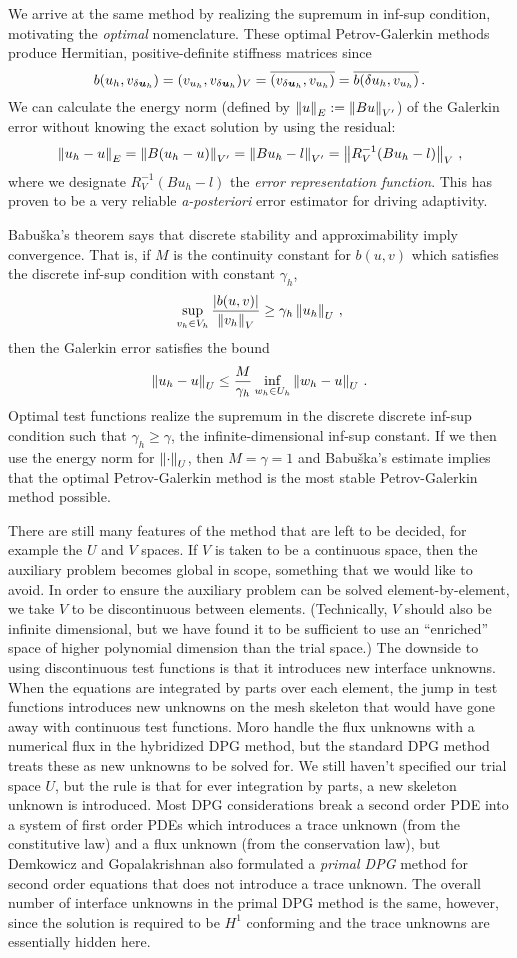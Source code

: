 \documentclass[Proposal.tex]{subfiles}
\begin{document}
We arrive at the same method by realizing the supremum in inf-sup condition, motivating the \emph{optimal} nomenclature.
These optimal Petrov-Galerkin methods produce Hermitian, positive-definite stiffness matrices since
\[
b(u_h,v_{\delta\boldsymbol{u}_h})=(v_{u_h},v_{\delta\boldsymbol{u}_h})_V=\overline{(v_{\delta\boldsymbol{u}_h},v_{u_h})}=\overline{b(\delta u_h,v_{u_h})}\,.
\]
We can calculate the energy norm (defined by $\left\| u \right\|_E:=\left\| Bu \right\|_{V'}$) of the Galerkin error without knowing the exact solution by using the residual:
\[
\left\| u_h-u \right\|_E=\left\| B(u_h-u) \right\|_{V'}=\left\| Bu_h-l \right\|_{V'}=\left\| R_V^{-1}(Bu_h-l) \right\|_V\,,
\]
where we designate $R_V^{-1}(Bu_h-l)$ the \emph{error representation function}.
This has proven to be a very reliable \emph{a-posteriori} error estimator for driving adaptivity.

Babu\v{s}ka's theorem\cite{Babuska70} says that discrete stability and approximability imply convergence.
That is, if $M$ is the continuity constant for $b(u,v)$ which satisfies the discrete inf-sup condition with constant $\gamma_h$,
\[
\sup_{v_h\in V_h}\frac{|b(u,v)|}{\left\| v_h \right\|_V}\geq\gamma_h\left\| u_h \right\|_U\,,
\]
then the Galerkin error satisfies the bound
\[
\left\| u_h-u \right\|_U\leq\frac{M}{\gamma_h}\inf_{w_h\in U_h}\left\| w_h-u \right\|_U\,.
\]
Optimal test functions realize the supremum in the discrete discrete inf-sup condition such that $\gamma_h\geq\gamma$, 
the infinite-dimensional inf-sup constant.
If we then use the energy norm for $\left\| \cdot \right\|_U$, then $M=\gamma=1$ and Babu\v{s}ka's estimate implies that
the optimal Petrov-Galerkin method is the most stable Petrov-Galerkin method possible.

There are still many features of the method that are left to be decided, for example the $U$ and $V$ spaces.
If $V$ is taken to be a continuous space, then the auxiliary problem becomes global in scope, something that we would like to avoid.
In order to ensure the auxiliary problem can be solved element-by-element, we take $V$ to be discontinuous between elements.
(Technically, $V$ should also be infinite dimensional, but we have found it to be sufficient to use an ``enriched'' space of higher
polynomial dimension than the trial space.)
The downside to using discontinuous test functions is that it introduces new interface unknowns.
When the equations are integrated by parts over each element, the jump in test functions introduces new unknowns on the mesh skeleton
that would have gone away with continuous test functions.
Moro \etal\cite{MoroNguyenPeraire11} handle the flux unknowns with a numerical flux in the hybridized DPG method, but the standard DPG method treats
these as new unknowns to be solved for.
We still haven't specified our trial space $U$, but the rule is that for ever integration by parts, a new skeleton unknown is introduced.
Most DPG considerations break a second order PDE into a system of first order PDEs which introduces a trace unknown (from the constitutive law) 
and a flux unknown (from the conservation law), but Demkowicz and Gopalakrishnan also formulated a \emph{primal DPG} method for second order equations
that does not introduce a trace unknown.
The overall number of interface unknowns in the primal DPG method is the same, however, since the solution is required to be $H^1$ conforming 
and the trace unknowns are essentially hidden here.
\end{document}
